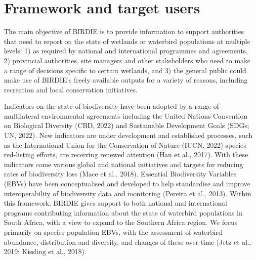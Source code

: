 \documentclass[utf8]{frontiersSCNS}
\begin{document}
\hypertarget{framework-and-target-users}{%
\section*{Framework and target users}\label{framework-and-target-users}}

The main objective of BIRDIE is to provide information to support
authorities that need to report on the state of wetlands or waterbird
populations at multiple levels: 1) as required by national and
international programmes and agreements, 2) provincial authorities, site
managers and other stakeholders who need to make a range of decisions
specific to certain wetlands, and 3) the general public could make use
of BIRDIE's freely available outputs for a variety of reasons, including
recreation and local conservation initiatives.

Indicators on the state of biodiversity have been adopted by a range of
multilateral environmental agreements including the United Nations
Convention on Biological Diversity (CBD, 2022) and Sustainable
Development Goals (SDGs; UN, 2022). New indicators are under development
and established processes, such as the International Union for the
Conservation of Nature (IUCN, 2022) species red-listing efforts, are
receiving renewed attention (Han et al., 2017). With these indicators
come various global and national initiatives and targets for reducing
rates of biodiversity loss (Mace et al., 2018). Essential Biodiversity
Variables (EBVs) have been conceptualised and developed to help
standardise and improve interoperability of biodiversity data and
monitoring (Pereira et al., 2013). Within this framework, BIRDIE gives
support to both national and international programs contributing
information about the state of waterbird populations in South Africa,
with a view to expand to the Southern Africa region. We focus primarily
on species population EBVs, with the assessment of waterbird abundance,
distribution and diversity, and changes of these over time (Jetz et al.,
2019; Kissling et al., 2018).
\end{document}
